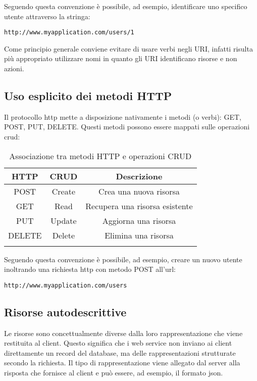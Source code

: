 Seguendo questa convenzione è possibile, ad esempio, identificare uno specifico utente attraverso la stringa:
\begin{lstlisting}[frame=none]
http://www.myapplication.com/users/1
\end{lstlisting}

Come principio generale conviene evitare di usare verbi negli URI, infatti risulta più appropriato utilizzare nomi in quanto gli URI identificano risorse e non azioni.

\subsection{Uso esplicito dei metodi HTTP}
Il protocollo \gls{http}\glsfirstoccur{} mette a disposizione nativamente i metodi (o verbi): GET, POST, PUT, DELETE. Questi metodi possono essere mappati sulle operazioni \gls{crud}\glsfirstoccur{}:  \bigskip

\begin{table}[H]
\centering
	\begin{tabular}{ccc}
		\toprule
		\textbf{HTTP} & \textbf{CRUD} & \textbf{Descrizione}\\
		\midrule
		POST & Create & Crea una nuova risorsa \\
		GET & Read & Recupera una risorsa esistente \\
		PUT & Update & Aggiorna una risorsa \\
		DELETE & Delete & Elimina una risorsa \\
		\bottomrule \\
	\end{tabular}
	\caption{Associazione tra metodi HTTP e operazioni CRUD}
\end{table}


Seguendo questa convenzione è possibile, ad esempio, creare un nuovo utente inoltrando una richiesta \gls{http}\glsfirstoccur{} con metodo POST all'\gls{url}\glsfirstoccur{}:
\begin{lstlisting}[frame=none]
http://www.myapplication.com/users
\end{lstlisting}

\subsection{Risorse autodescrittive}
Le risorse sono concettualmente diverse dalla loro rappresentazione che viene restituita al client. Questo significa che i web service non inviano ai client direttamente un record del database, ma delle rappresentazioni strutturate secondo la richiesta. Il tipo di rappresentazione viene allegato dal server alla risposta che fornisce al client e può essere, ad esempio, il formato \gls{json}\glsfirstoccur{}.

